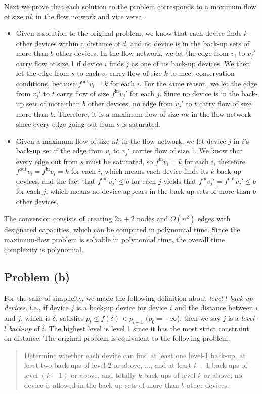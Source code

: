 \documentclass[12pt,letterpaper]{article}
\begin{document}
Next we prove that each solution to the problem corresponds to a maximum flow of size $nk$ in the flow network and vice versa.
\begin{itemize}
\item Given a solution to the original problem, we know that each device finds $k$ other devices within a distance of $d$, and no device is in the back-up sets of more than $b$ other devices. In the flow network, we let the edge from $v_i$ to $v_j'$ carry flow of size 1 if device $i$ finds $j$ as one of its back-up devices. We then let the edge from $s$ to each $v_i$ carry flow of size $k$ to meet conservation conditions, because $f^{\textrm{out}}v_i = k$ for each $i$. For the same reason, we let the edge from $v_j'$ to $t$ carry flow of size $f^{\textrm{in}}v_j'$ for each $j$. Since no device is in the back-up sets of more than $b$ other devices, no edge from $v_j'$ to $t$ carry flow of size more than $b$. Therefore, it is a maximum flow of size $nk$ in the flow network since every edge going out from $s$ is saturated.
\item Given a maximum flow of size $nk$ in the flow network, we let device $j$ in $i$'s back-up set if the edge from $v_i$ to $v_j'$ carries flow of size 1. We know that every edge out from $s$ must be saturated, so $f^{\textrm{in}}v_i=k$ for each $i$, therefore $f^{\textrm{out}}v_i=f^{\textrm{in}}v_i=k$ for each $i$,  which means each device finds its $k$ back-up devices,  and the fact that $f^{\textrm{out}}v_j'\le b$ for each $j$ yields that $f^{\textrm{in}}v_j'=f^{\textrm{out}}v_j'\le b$ for each $j$, which means no device appears in the back-up sets of more than $b$ other devices. 
\end{itemize}

The conversion consists of creating $2n+2$ nodes and $O(n^2)$ edges with designated capacities, which can be computed in polynomial time. Since the maximum-flow problem is solvable in polynomial time, the overall time complexity is polynomial.

\subsection*{Problem (b)}
For the sake of simplicity, we made the following definition about \emph{level-$l$ back-up devices}. i.e., if device $j$ is a back-up device for device $i$ and the distance between $i$ and $j$, which is $\delta$, satisfies $p_l\le f(\delta)< p_{l-1}$ ($p_0=+\infty$), then we say $j$ is a \emph{level-$l$ back-up} of $i$. The highest level is level 1 since it has the most strict constraint on distance. The original problem is equivalent to the following problem.
\begin{quote}
Determine whether each device can find at least one level-1 back-up, at least two back-ups of level 2 or above, $\dots$, and at least $k-1$ back-ups of level-$(k-1)$ or above, and totally $k$ back-ups of level-$k$ or above; no device is allowed in the back-up sets of more than $b$ other devices.
\end{quote}
\end{document}
